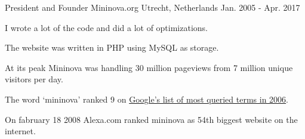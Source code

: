 \begin{cventries}
  \cventry
    {President and Founder} %
    {Mininova.org} %
    {Utrecht, Netherlands} %
    {Jan. 2005 - Apr. 2017} %
    {
      \begin{cvitems} %
				\item {I wrote a lot of the code and did a lot of optimizations.}
				\item {The website was written in PHP using MySQL as storage.}
				\item {At its peak Mininova was handling 30 million pageviews from 7 million unique visitors per day.}
				\item {The word ‘mininova’ ranked 9 on \href{https://archive.google.com/press/zeitgeist2006.html}{\textcolor{link}{Google’s list of most queried terms in 2006}}.}
				\item {On fabruary 18 2008 Alexa.com ranked mininova as 54th biggest website on the internet.}
      \end{cvitems}
    }

\end{cventries}
